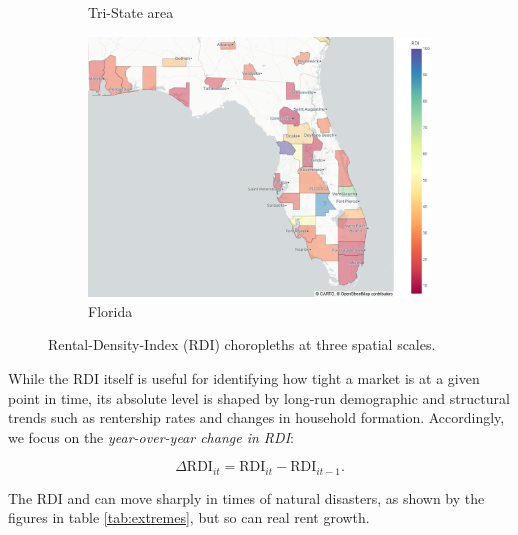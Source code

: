 \documentclass[APA,Times1COL]{WileyNJDv5} %
\begin{document}
\begin{figure}[hbt!]
\begin{subfigure}[b]{0.32\textwidth}
		\caption{Tri-State area}\label{fig:tristate_choropleth}
	\end{subfigure}\hfill
	\begin{subfigure}[b]{0.32\textwidth}
		\includegraphics[width=\linewidth]{florida.png}
		\caption{Florida}\label{fig:florida_choropleth}
	\end{subfigure}
	
	\caption{Rental-Density-Index (RDI) choropleths at three spatial scales.}
	\label{fig:choropleth_panel}
\end{figure}


While the RDI itself is useful for identifying how tight a market is at a given point in time, its absolute level is shaped by long-run demographic and structural trends such as rentership rates and changes in household formation. Accordingly, we focus on the \textit{year-over-year change in RDI}:

\begin{equation*}
	\Delta \text{RDI}_{it} = \text{RDI}_{it} - \text{RDI}_{it-1}.
\end{equation*}

The RDI and can move sharply in times of natural disasters, as shown by the figures in table \ref{tab:extremes}, but so can real rent growth.  
\end{document}
